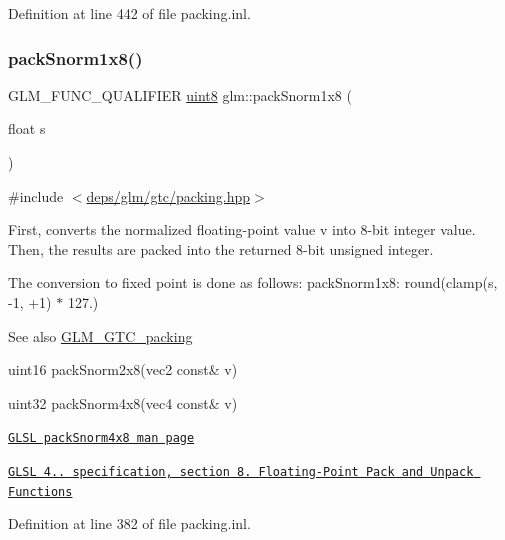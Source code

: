 Definition at line 442 of file packing.\+inl.

\mbox{\label{group__gtc__packing_ga26b6cd7a35c46c4b6a342f3b97b47423}} 
\subsubsection{\texorpdfstring{pack\+Snorm1x8()}{packSnorm1x8()}}
{\footnotesize\ttfamily G\+L\+M\+\_\+\+F\+U\+N\+C\+\_\+\+Q\+U\+A\+L\+I\+F\+I\+ER \hyperlink{group__gtc__type__precision_ga1a7dcd8aac97cc8020817c94049deff2}{uint8} glm\+::pack\+Snorm1x8 (\begin{DoxyParamCaption}\item[{float}]{s }\end{DoxyParamCaption})}



{\ttfamily \#include $<$\hyperlink{gtc_2packing_8hpp}{deps/glm/gtc/packing.\+hpp}$>$}

First, converts the normalized floating-\/point value v into 8-\/bit integer value. Then, the results are packed into the returned 8-\/bit unsigned integer.

The conversion to fixed point is done as follows\+: pack\+Snorm1x8\+: round(clamp(s, -\/1, +1) $\ast$ 127.)

\begin{DoxySeeAlso}{See also}
\hyperlink{group__gtc__packing}{G\+L\+M\+\_\+\+G\+T\+C\+\_\+packing} 

uint16 pack\+Snorm2x8(vec2 const\& v) 

uint32 pack\+Snorm4x8(vec4 const\& v) 

\href{http://www.opengl.org/sdk/docs/manglsl/xhtml/packSnorm4x8.xml}{\tt G\+L\+SL pack\+Snorm4x8 man page} 

\href{http://www.opengl.org/registry/doc/GLSLangSpec.4.20.8.pdf}{\tt G\+L\+SL 4.. specification, section 8. Floating-\/\+Point Pack and Unpack Functions} 
\end{DoxySeeAlso}


Definition at line 382 of file packing.\+inl.

\mbox{\label{group__gtc__packing_ga05d08a82923166ec7cd5d0e6154c9953}} 
